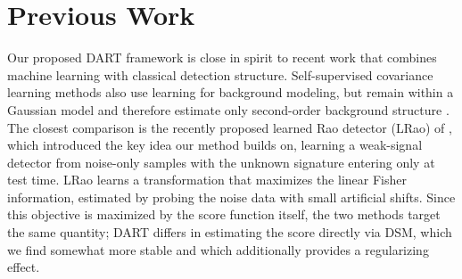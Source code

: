 \chapter{Previous Work}
\label{chap:pw}
Our proposed DART framework is close in spirit to recent work that combines machine learning with classical detection structure. Self-supervised covariance learning methods also use learning for background modeling, but remain within a Gaussian model and therefore estimate only second-order background structure \cite{diskin2024self}. The closest comparison is the recently proposed learned Rao detector (LRao) of \cite{lrao2026}, which introduced the key idea our method builds on, learning a weak-signal detector from noise-only samples with the unknown signature entering only at test time. LRao learns a transformation that maximizes the linear Fisher information, estimated by probing the noise data with small artificial shifts. Since this objective is maximized by the score function itself, the two methods target the same quantity; DART differs in estimating the score directly via DSM, which we find
somewhat more stable and which additionally provides a regularizing effect.

